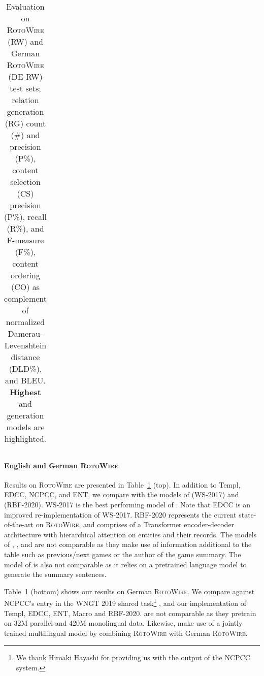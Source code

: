 \begin{table}[t]
\begin{tabular}{@{}l@{~}|@{~}c@{~~~}c@{~}|c@{~~~}c@{~~~}c@{~}|@{~}c@{~}|@{~}c@{}}
\end{tabular}
\vspace*{-.2ex}
\caption{Evaluation on
  \textsc{RotoWire} (RW) and German \textsc{RotoWire} (DE-RW) test sets; relation
  generation (RG) count (\#) and precision (P\%), content selection
  (CS) precision (P\%), recall (R\%), and F-measure (F\%), content
  ordering (CO) as complement of normalized Damerau-Levenshtein distance (DLD\%),
  and BLEU.  \textbf{Highest} and  generation models
  are highlighted.}
\label{tbl:results-with-ie-test} 
\end{table}

\paragraph{English and German \textsc{RotoWire}}
Results on \textsc{RotoWire} are presented in
Table~\ref{tbl:results-with-ie-test} (top). In addition to Templ,
EDCC, NCPCC, and ENT, we compare with the models of
\citet{wiseman-etal-2017-challenges} (WS-2017) and
\citet{rebuffel2020hierarchical} (RBF-2020). WS-2017 is the best
performing model of \citet{wiseman-etal-2017-challenges}. Note that
EDCC is an improved re-implementation of WS-2017. RBF-2020
represents the current state-of-the-art on \textsc{RotoWire}, and
comprises of a Transformer encoder-decoder architecture
\cite{NIPS2017_7181} with hierarchical attention on entities and their
records. The models of \citet{saleh-etal-2019-naver},
\citet{iso-etal-2019-learning}, and \citet{gong-etal-2019-table} are
not comparable as they make use of information additional to the table
such as previous/next games or the author of the game summary. The
model of \citet{narayan-etal-2020-stepwise} is also not comparable as
it relies on a pretrained language model
\cite{rothe-etal-2020-leveraging} to generate the summary sentences.

Table~\ref{tbl:results-with-ie-test} (bottom) shows our results on
German \textsc{RotoWire}. We compare against NCPCC's entry in the
WNGT 2019 shared task\footnote{We thank Hiroaki Hayashi for providing
  us with the output of the NCPCC system.}
\cite{hayashi-etal-2019-findings}, and our implementation of Templ, EDCC, ENT, Macro
and RBF-2020.
\citet{saleh-etal-2019-naver} are not comparable as they pretrain on
32M parallel and 420M monolingual data. Likewise,
\citet{puduppully-etal-2019-university} make use of a jointly trained
multilingual model by combining \textsc{RotoWire} with German
\textsc{RotoWire}.


